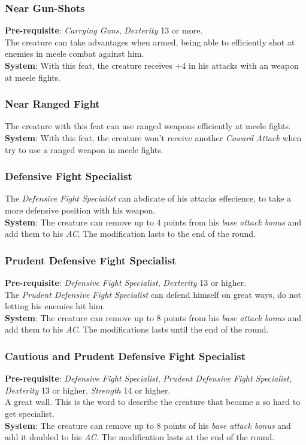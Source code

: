 \documentclass[ letterpaper,12pt]{article}
\begin{document}
\subsubsection{Near Gun-Shots}
{\bf Pre-requisite}: {\it Carrying Guns}, {\it Dexterity} 13 or more.\\
The creature can take advantages when armed, being able to efficiently shot at enemies in meele combat against him.\\
{\bf System}: With this feat, the creature receives +4 in his attacks with an weapon at meele fights.

\subsubsection{Near Ranged Fight}
The creature with this feat can use ranged weapons efficiently at meele fights.\\
{\bf System}: With this feat, the creature won't receive another {\it Coward Attack} when try to use a ranged weapon in meele fights.

\subsubsection{Defensive Fight Specialist}
The {\it Defensive Fight Specialist} can abdicate of his attacks effecience, to take a more defensive position with his weapon.\\
{\bf System}: The creature can remove up to 4 points from his {\it base attack bonus} and add them to his {\it AC}. The modification lasts to the end of the round.

\subsubsection{Prudent Defensive Fight Specialist}
{\bf Pre-requisite}: {\it Defensive Fight Specialist}, {\it Dexterity} 13 or higher.\\
The {\it Prudent Defensive Fight Specialist} can defend himself on great ways, do not letting his enemies hit him.\\
{\bf System}: The creature can remove up to 8 points from his{ \it base attack bonus} and add them to his {\it AC}. The modifications lasts until the end of the round.

\subsubsection{Cautious and Prudent Defensive Fight Specialist}
{\bf Pre-requisite}: {\it Defensive Fight Specialist}, {\it Prudent Defensive Fight Specialist}, {\it Dexterity} 13 or higher, {\it Strength} 14 or higher.\\
A great wall. This is the word to describe the creature that became a so hard to get specialist.\\
{\bf System}: The creature can remove up to 8 points of his {\it base attack bonus} and add it doubled to his {\it AC}. The modification lasts at the end of the round.
\end{document}
